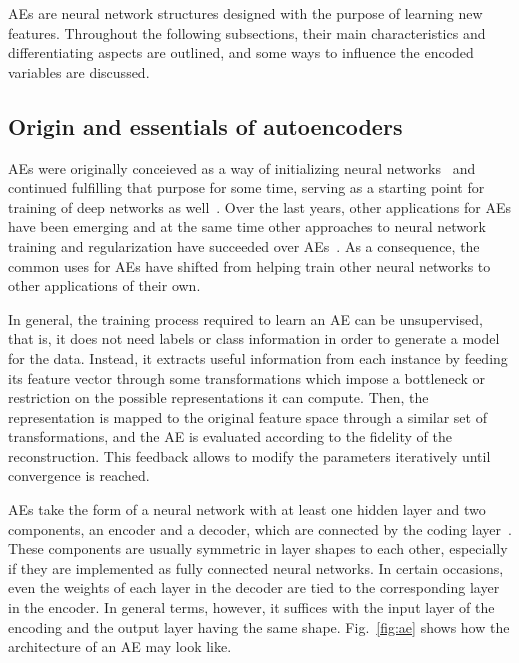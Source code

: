 \documentclass[
	fontsize=11pt, %
	twoside=false, %
	open=any, %
	secnumdepth=1, %
]{kaobook}
\begin{document}
AEs are neural network structures designed with the purpose of learning new features. Throughout the following subsections, their main characteristics and differentiating aspects are outlined, and some ways to influence the encoded variables are discussed.

\subsection{Origin and essentials of autoencoders}

AEs were originally conceieved as a way of initializing neural networks~\cite{ballard} and continued fulfilling that purpose for some time, serving as a starting point for training of deep networks as well~\cite{hinton2006fast}. Over the last years, other applications for AEs have been emerging and at the same time other approaches to neural network training and regularization have succeeded over AEs~\cite{relu,dropout}. As a consequence,  the common uses for AEs have shifted from helping train other neural networks to other applications of their own.

In general, the training process required to learn an AE can be unsupervised, that is, it does not need labels or class information in order to generate a model for the data. Instead, it extracts useful information from each instance by feeding its feature vector through some transformations which impose a bottleneck or restriction on the possible representations it can compute. Then, the representation is mapped to the original feature space through a similar set of transformations, and the AE is evaluated according to the fidelity of the reconstruction. This feedback allows to modify the parameters iteratively until convergence is reached.

AEs take the form of a neural network with at least one hidden layer and two components, an encoder and a decoder, which are connected by the coding layer~\cite{charte-tutorial}. These components are usually symmetric in layer shapes to each other, especially if they are implemented as fully connected neural networks. In certain occasions, even the weights of each layer in the decoder are tied to the corresponding layer in the encoder. In general terms, however, it suffices with the input layer of the encoding and the output layer having the same shape. Fig.~\ref{fig:ae} shows how the architecture of an AE may look like.
\end{document}
